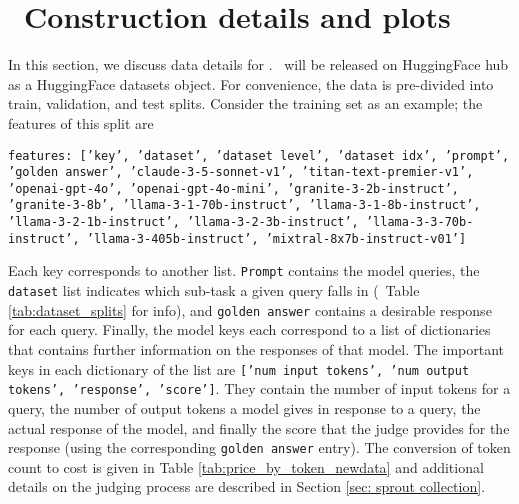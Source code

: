 \section{\newdata\ Construction details and plots}\label{sec:append:sprout}
In this section, we discuss data details for \newdata. \newdata\ will be released on HuggingFace hub as a HuggingFace datasets object. For convenience, the data is pre-divided into train, validation, and test splits. Consider the training set as an example; the features of this split are

\texttt{features: ['key', 'dataset', 'dataset level', 'dataset idx', 'prompt', 'golden answer',
'claude-3-5-sonnet-v1', 'titan-text-premier-v1', 'openai-gpt-4o', 'openai-gpt-4o-mini',
'granite-3-2b-instruct', 'granite-3-8b', 'llama-3-1-70b-instruct', 'llama-3-1-8b-instruct',
'llama-3-2-1b-instruct', 'llama-3-2-3b-instruct', 'llama-3-3-70b-instruct', 'llama-3-405b-instruct', 'mixtral-8x7b-instruct-v01']} 




Each key corresponds to another list. \texttt{Prompt} contains the model queries, the \texttt{dataset} list indicates which sub-task a given query falls in (\cf\ Table \ref{tab:dataset_splits} for info), and \texttt{golden answer} contains a desirable response for each query. Finally, the model keys each correspond to a list of dictionaries that contains further information on the responses of that model. The important keys in each dictionary of the list are \texttt{['num input tokens', 'num output tokens', 'response', 'score']}. They contain the number of input tokens for a query, the number of output tokens a model gives in response to a query, the actual response of the model, and finally the score that the judge provides for the response (using the corresponding \texttt{golden answer} entry). The conversion of token count to cost is given in Table \ref{tab:price_by_token_newdata} and additional details on the judging process are described in Section \ref{sec: sprout collection}.

